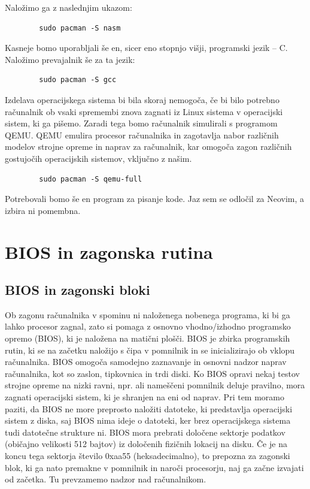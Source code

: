\documentclass{report}
\begin{document}
Naložimo ga z naslednjim ukazom:
    \begin{verbatim}
        sudo pacman -S nasm
    \end{verbatim}

Kasneje bomo uporabljali še en, sicer eno stopnjo višji, programski jezik – C.
Naložimo prevajalnik še za ta jezik:
    \begin{verbatim}
        sudo pacman -S gcc
    \end{verbatim}

Izdelava operacijskega sistema bi bila skoraj nemogoča, če bi bilo potrebno računalnik ob vsaki spremembi znova zagnati iz Linux sistema v operacijski sistem, ki ga pišemo. Zaradi tega bomo računalnik simulirali s programom QEMU. QEMU emulira procesor računalnika in zagotavlja nabor različnih modelov strojne opreme in naprav za računalnik, kar omogoča zagon različnih gostujočih operacijskih sistemov, vključno z našim.
    \begin{verbatim}
        sudo pacman -S qemu-full
    \end{verbatim}
Potrebovali bomo še en program za pisanje kode. Jaz sem se odločil za Neovim, a izbira ni pomembna.

\chapter{BIOS in zagonska rutina}

\section{BIOS in zagonski bloki}
Ob zagonu računalnika v spominu ni naloženega nobenega programa, ki bi ga lahko procesor zagnal, zato si pomaga z osnovno vhodno/izhodno programsko opremo (BIOS), ki je naložena na matični plošči. BIOS je zbirka programskih rutin, ki se na začetku naložijo s čipa v pomnilnik in se inicializirajo ob vklopu računalnika. BIOS omogoča samodejno zaznavanje in osnovni nadzor naprav računalnika, kot so zaslon, tipkovnica in trdi diski. Ko BIOS opravi nekaj testov strojne opreme na nizki ravni, npr. ali nameščeni pomnilnik deluje pravilno, mora zagnati operacijski sistem, ki je shranjen na eni od naprav. Pri tem moramo paziti, da BIOS ne more preprosto naložiti datoteke, ki predstavlja operacijski sistem z diska, saj BIOS nima ideje o datoteki, ker brez operacijskega sistema tudi datotečne strukture ni. BIOS mora prebrati določene sektorje podatkov (običajno velikosti 512 bajtov) iz določenih fizičnih lokacij na disku. Če je na koncu tega sektorja število 0xaa55 (heksadecimalno), to prepozna za zagonski blok, ki ga nato premakne v pomnilnik in naroči procesorju, naj ga začne izvajati od začetka. Tu prevzamemo nadzor nad računalnikom.
\end{document}

